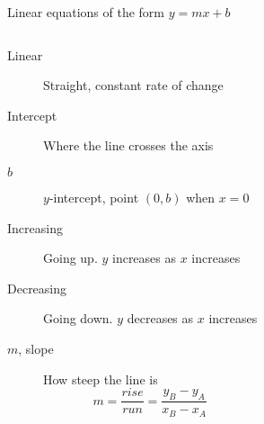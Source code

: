 \begin{frame}{Linear equations of the form $y=mx+b$}
  \begin{columns}
    \begin{description}
      \item[Linear] Straight, constant rate of change
      \item[Intercept] Where the line crosses the axis
      \item[$b$] $y$-intercept, point $(0,b)$ when $x=0$
      \item[Increasing] Going up. $y$ increases as $x$ increases
      \item[Decreasing] Going down. $y$ decreases as $x$ increases
      \item[$m$, slope] How steep the line is 
      $$m=\frac{rise}{run}=\frac{y_B-y_A}{x_B-x_A}$$
    \end{description}
    \begin{flushright}
    \end{flushright}
  \end{columns}
\end{frame}

